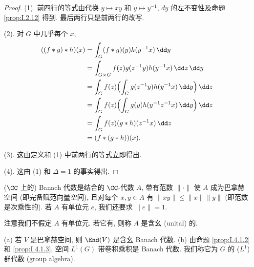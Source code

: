 \begin{proof}
(1). 前四行的等式由代换 $y \longmapsto xy$ 和 $y \longmapsto y^{-1}$, $dy$ 的左不变性及命题 \ref{prop:I.2.12} 得到. 最后两行只是前两行的改写.

(2). 对 $G$ 中几乎每个 $x$,
\begin{align*}
((f * g) * h)(x) &= \int_G (f * g)(y)h(y^{-1}x)\,\dd y \\
&= \int_{G \times G} f(z)g(z^{-1}y)h(y^{-1}x)\,\dd z\,\dd y \\
&= \int_G f(z)\Bigl(\int_G g(z^{-1}y)h(y^{-1}x)\,\dd y\Bigr)\,\dd z \\
&= \int_G f(z)\Bigl(\int_G g(y)h(y^{-1}z^{-1}x)\,\dd y\Bigr)\,\dd z \\
&= \int_G f(z)(g * h)(z^{-1}x)\,\dd z \\
&= (f * (g * h))(x).
\end{align*}

(3). 这由定义和 (1) 中前两行的等式立即得出.

(4). 这由 (1) 和 $\Delta = 1$ 的事实得出.
\end{proof}

\begin{definition}
\label{def:I.4.1.4}
($\CC$ 上的) Banach 代数是结合的 $\CC$-代数 $A$, 带有范数 $\|\cdot\|$ 使 $A$ 成为巴拿赫空间 (即完备赋范向量空间), 且对每个 $x, y \in A$ 有 $\|xy\| \leq \|x\|\|y\|$ (即范数是次乘性的). 若 $A$ 有单位元 $e$, 我们还要求 $\|e\| = 1$.
\end{definition}

注意我们不假定 $A$ 有单位元. 若它有, 则称 $A$ 是含幺 (unital) 的.

\begin{example}
\label{exa:I.4.1.5}
(a) 若 $V$ 是巴拿赫空间, 则 $\End(V)$ 是含幺 Banach 代数.
(b) 由命题 \ref{prop:I.4.1.2} 和 \ref{prop:I.4.1.3}, 空间 $L^1(G)$ 带卷积乘积是 Banach 代数. 我们称它为 $G$ 的 ($L^1$) 群代数 (group algebra).
\end{example}

